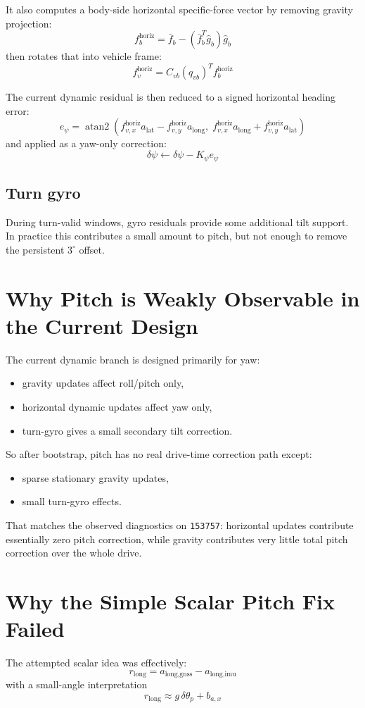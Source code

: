 \documentclass[11pt]{article}
\begin{document}
It also computes a body-side horizontal specific-force vector by removing gravity projection:
\[
f^{\text{horiz}}_b
=
\bar f_b - (\bar f_b^T \hat g_b)\hat g_b
\]
then rotates that into vehicle frame:
\[
f^{\text{horiz}}_v = C_{vb}(q_{vb})^T f^{\text{horiz}}_b
\]

The current dynamic residual is then reduced to a signed horizontal heading error:
\[
e_\psi
=
\operatorname{atan2}
\left(
f^{\text{horiz}}_{v,x} a_{\text{lat}} - f^{\text{horiz}}_{v,y} a_{\text{long}},
\;
f^{\text{horiz}}_{v,x} a_{\text{long}} + f^{\text{horiz}}_{v,y} a_{\text{lat}}
\right)
\]
and applied as a yaw-only correction:
\[
\delta \psi \leftarrow \delta \psi - K_\psi e_\psi
\]

\subsection{Turn gyro}
During turn-valid windows, gyro residuals provide some additional tilt support. In practice this contributes a small amount to pitch, but not enough to remove the persistent \(3^\circ\) offset.

\section{Why Pitch is Weakly Observable in the Current Design}
The current dynamic branch is designed primarily for yaw:
\begin{itemize}[leftmargin=1.5em]
\item gravity updates affect roll/pitch only,
\item horizontal dynamic updates affect yaw only,
\item turn-gyro gives a small secondary tilt correction.
\end{itemize}

So after bootstrap, pitch has no real drive-time correction path except:
\begin{itemize}[leftmargin=1.5em]
\item sparse stationary gravity updates,
\item small turn-gyro effects.
\end{itemize}

That matches the observed diagnostics on \texttt{153757}: horizontal updates contribute essentially zero pitch correction, while gravity contributes very little total pitch correction over the whole drive.

\section{Why the Simple Scalar Pitch Fix Failed}
The attempted scalar idea was effectively:
\[
r_{\text{long}} = a_{\text{long,gnss}} - a_{\text{long,imu}}
\]
with a small-angle interpretation
\[
r_{\text{long}} \approx g \, \delta \theta_p + b_{a,x}
\]
\end{document}
